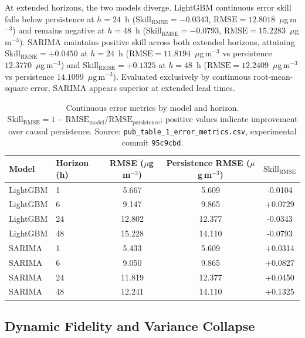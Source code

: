 \documentclass[12pt]{article}
\begin{document}
At extended horizons, the two models diverge. LightGBM continuous
error skill falls below persistence at $h = 24$~h
($\mathrm{Skill}_\mathrm{RMSE} = -0.0343$,
$\mathrm{RMSE} = 12.8018$~$\mu$g\,m$^{-3}$) and remains negative at
$h = 48$~h ($\mathrm{Skill}_\mathrm{RMSE} = -0.0793$,
$\mathrm{RMSE} = 15.2283$~$\mu$g\,m$^{-3}$). SARIMA maintains positive
skill across both extended horizons, attaining
$\mathrm{Skill}_\mathrm{RMSE} = +0.0450$ at $h = 24$~h
($\mathrm{RMSE} = 11.8194$~$\mu$g\,m$^{-3}$ vs persistence
$12.3770$~$\mu$g\,m$^{-3}$) and $\mathrm{Skill}_\mathrm{RMSE} = +0.1325$
at $h = 48$~h ($\mathrm{RMSE} = 12.2409$~$\mu$g\,m$^{-3}$ vs
persistence $14.1099$~$\mu$g\,m$^{-3}$). Evaluated exclusively by
continuous root-mean-square error, SARIMA appears superior at extended
lead times.

\begin{table}[ht]
\centering
\caption{Continuous error metrics by model and horizon.
$\mathrm{Skill}_\mathrm{RMSE} = 1 - \mathrm{RMSE}_\mathrm{model} /
\mathrm{RMSE}_\mathrm{persistence}$; positive values indicate
improvement over causal persistence.
Source: \texttt{pub\_table\_1\_error\_metrics.csv}, experimental commit
\texttt{95c9cbd}.}
\label{tab:error_metrics}
\begin{tabular}{llSSS}
\toprule
Model & Horizon (h) &
  {RMSE ($\mu$g\,m$^{-3}$)} &
  {Persistence RMSE ($\mu$g\,m$^{-3}$)} &
  {$\mathrm{Skill}_\mathrm{RMSE}$} \\
\midrule
LightGBM & 1  & 5.667 & 5.609 & -0.0104 \\
LightGBM & 6  & 9.147 & 9.865 & +0.0729 \\
LightGBM & 24 & 12.802 & 12.377 & -0.0343 \\
LightGBM & 48 & 15.228 & 14.110 & -0.0793 \\
\addlinespace
SARIMA   & 1  & 5.433 & 5.609 & +0.0314 \\
SARIMA   & 6  & 9.050 & 9.865 & +0.0827 \\
SARIMA   & 24 & 11.819 & 12.377 & +0.0450 \\
SARIMA   & 48 & 12.241 & 14.110 & +0.1325 \\
\bottomrule
\end{tabular}
\end{table}

\subsection{Dynamic Fidelity and Variance Collapse}
\label{sec:results_dynamic_fidelity}
\end{document}

